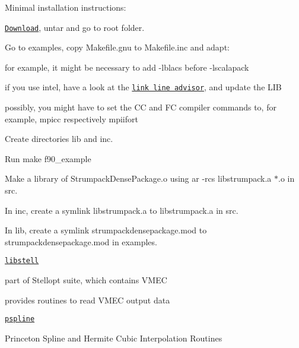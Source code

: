 \begin{DoxyItemize}
\begin{DoxyItemize}
\item Minimal installation instructions\+:
\begin{DoxyEnumerate}
\item \href{http://portal.nersc.gov/project/sparse/strumpack/STRUMPACK-Dense-1.1.1.tar.gz}{\tt Download}, untar and go to root folder.
\item Go to examples, copy {\ttfamily Makefile.\+gnu} to {\ttfamily Makefile.\+inc} and adapt\+:
\begin{DoxyEnumerate}
\item for example, it might be necessary to add {\ttfamily -\/lblacs} before {\ttfamily -\/lscalapack}
\item if you use intel, have a look at the \href{https://software.intel.com/en-us/articles/intel-mkl-link-line-advisor}{\tt link line advisor}, and update the {\ttfamily L\+IB}
\item possibly, you might have to set the {\ttfamily CC} and {\ttfamily FC} compiler commands to, for example, {\ttfamily mpicc} respectively {\ttfamily mpiifort}
\end{DoxyEnumerate}
\item Create directories {\ttfamily lib} and {\ttfamily inc}.
\item Run {\ttfamily make f90\+\_\+example}
\item Make a library of {\ttfamily Strumpack\+Dense\+Package.\+o} using {\ttfamily ar -\/rcs libstrumpack.\+a $\ast$.o} in src.
\item In inc, create a symlink {\ttfamily libstrumpack.\+a} to {\ttfamily libstrumpack.\+a} in src.
\item In lib, create a symlink {\ttfamily strumpackdensepackage.\+mod} to {\ttfamily strumpackdensepackage.\+mod} in examples.
\end{DoxyEnumerate}
\end{DoxyItemize}
\item \href{http://vmecwiki.pppl.wikispaces.net/STELLOPT+Compilation}{\tt libstell}
\begin{DoxyItemize}
\item part of Stellopt suite, which contains V\+M\+EC
\item provides routines to read V\+M\+EC output data
\end{DoxyItemize}
\item \href{https://w3.pppl.gov/ntcc/PSPLINE/}{\tt pspline}
\begin{DoxyItemize}
\item Princeton Spline and Hermite Cubic Interpolation Routines

\end{DoxyItemize}
\end{DoxyItemize}
